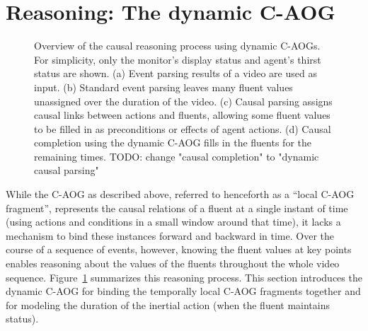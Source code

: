 \documentclass[10pt,journal,letterpaper,compsoc]{IEEEtran}
\begin{document}
\section{Reasoning: The dynamic C-AOG}



\begin{figure}[htp]
\centering

\caption{Overview of the causal reasoning process using dynamic C-AOGs.  For simplicity, only the monitor's display status and agent's thirst status are shown.  (a) Event parsing results of a video are used as input.  (b) Standard event parsing leaves many fluent values unassigned over the duration of the video.  (c) Causal parsing assigns causal links between actions and fluents, allowing some fluent values to be filled in as preconditions or effects of agent actions.  (d) Causal completion using the dynamic C-AOG fills in the fluents for the remaining times.  TODO: change "causal completion" to "dynamic causal parsing"
 \label{fig:flowchart}}
\end{figure}



While the C-AOG as described above, referred to henceforth as a ``local C-AOG fragment'', represents the causal relations of a fluent at a single instant of time (using actions and conditions in a small window around that time), it lacks a mechanism to bind these instances forward and backward in time.  Over the course of a sequence of events, however, knowing the fluent values at key points enables reasoning about the values of the fluents throughout the whole video sequence.  Figure~\ref{fig:flowchart} summarizes this reasoning process.  %
This section introduces the dynamic C-AOG for binding the temporally local C-AOG fragments together and for modeling the duration of the inertial action (when the fluent maintains status).
\end{document}
